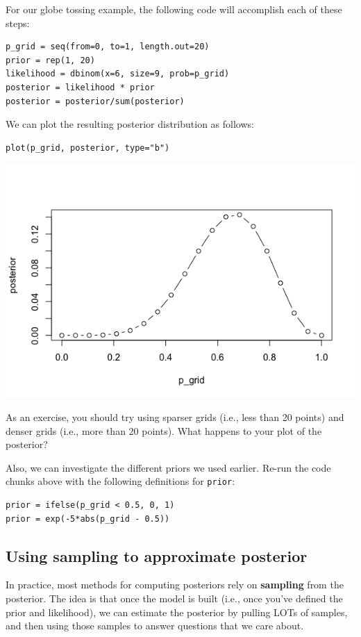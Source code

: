 \documentclass[11pt]{article}
\begin{document}
For our globe tossing example, the following code will accomplish each of these steps:

\begin{verbatim}
p_grid = seq(from=0, to=1, length.out=20)
prior = rep(1, 20)
likelihood = dbinom(x=6, size=9, prob=p_grid)
posterior = likelihood * prior
posterior = posterior/sum(posterior)
\end{verbatim}

We can plot the resulting posterior distribution as follows:

\begin{verbatim}
plot(p_grid, posterior, type="b")
\end{verbatim}

\includegraphics[width=.9\linewidth]{figures/week8/gridApproximation.png}

As an exercise, you should try using sparser grids (i.e., less than 20 points) and denser grids (i.e., more than 20 points).  What happens to your plot of the posterior?

Also, we can investigate the different priors we used earlier.  Re-run the code chunks above with the following definitions for \texttt{prior}:

\begin{verbatim}
prior = ifelse(p_grid < 0.5, 0, 1)
prior = exp(-5*abs(p_grid - 0.5))
\end{verbatim}

\subsection*{Using sampling to approximate posterior}
\label{sec-6-2}

In practice, most methods for computing posteriors rely on \textbf{sampling} from the posterior.  The idea is that once the model is built (i.e., once you've defined the prior and likelihood), we can estimate the posterior by pulling LOTs of samples, and then using those samples to answer questions that we care about.
\end{document}
